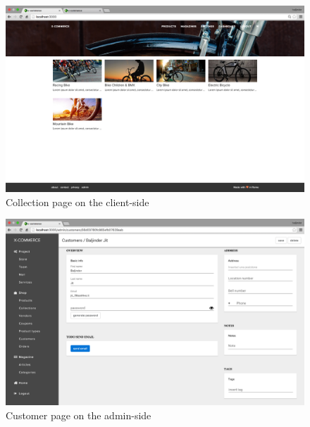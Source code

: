 \begin{figure}[htb]
\centering
\includegraphics[width=1.0\linewidth]{images/chapter4/page-collection.png}\hfill
\caption[Collection page on the client-side]{Collection page on the client-side}
\label{fig:page_collection_cli}
\end{figure}
\newpage
\begin{figure}[htb]
\centering
\includegraphics[width=1.0\linewidth]{images/chapter4/page-customer.png}\hfill
\caption[Customer page on the admin-side]{Customer page on the admin-side}
\label{fig:page_customer_admin}
\end{figure}
